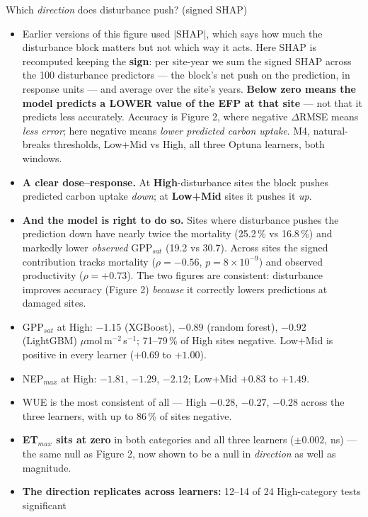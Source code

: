 \documentclass[11pt,a4paper]{article}
\begin{document}
Which \emph{direction} does disturbance push? (signed SHAP)
\begin{itemize}
  \item Earlier versions of this figure used $|$SHAP$|$, which says how much the disturbance block
        matters but not which way it acts. Here SHAP is recomputed keeping the \textbf{sign}: per
        site-year we sum the signed SHAP across the 100 disturbance predictors --- the block's net push
        on the prediction, in response units --- and average over the site's years.
        \textbf{Below zero means the model predicts a LOWER value of the EFP at that site} --- not
        that it predicts less accurately. Accuracy is Figure 2, where negative $\Delta$RMSE means
        \emph{less error}; here negative means \emph{lower predicted carbon uptake}. M4, natural-breaks thresholds,
        Low+Mid vs High, all three Optuna learners, both windows.
  \item \textbf{A clear dose--response.} At \textbf{High}-disturbance sites the block pushes predicted
        carbon uptake \emph{down}; at \textbf{Low+Mid} sites it pushes it \emph{up}.
  \item \textbf{And the model is right to do so.} Sites where disturbance pushes the prediction down
        have nearly twice the mortality (25.2\,\% vs 16.8\,\%) and markedly lower \emph{observed}
        GPP$_{sat}$ (19.2 vs 30.7). Across sites the signed contribution tracks mortality
        ($\rho = -0.56$, $p = 8\times10^{-9}$) and observed productivity ($\rho = +0.73$).
        The two figures are consistent: disturbance improves accuracy (Figure 2) \emph{because} it
        correctly lowers predictions at damaged sites.
  \item GPP$_{sat}$ at High: $-1.15$ (XGBoost), $-0.89$ (random forest), $-0.92$ (LightGBM)
        $\mu$mol\,m$^{-2}$\,s$^{-1}$; 71--79\,\% of High sites negative. Low+Mid is positive in every
        learner ($+0.69$ to $+1.00$).
  \item NEP$_{max}$ at High: $-1.81$, $-1.29$, $-2.12$; Low+Mid $+0.83$ to $+1.49$.
  \item WUE is the most consistent of all --- High $-0.28$, $-0.27$, $-0.28$ across the three learners,
        with up to 86\,\% of sites negative.
  \item \textbf{ET$_{max}$ sits at zero} in both categories and all three learners ($\pm0.002$, ns) ---
        the same null as Figure 2, now shown to be a null in \emph{direction} as well as magnitude.
  \item \textbf{The direction replicates across learners:} 12--14 of 24 High-category tests significant

\end{itemize}
\end{document}
